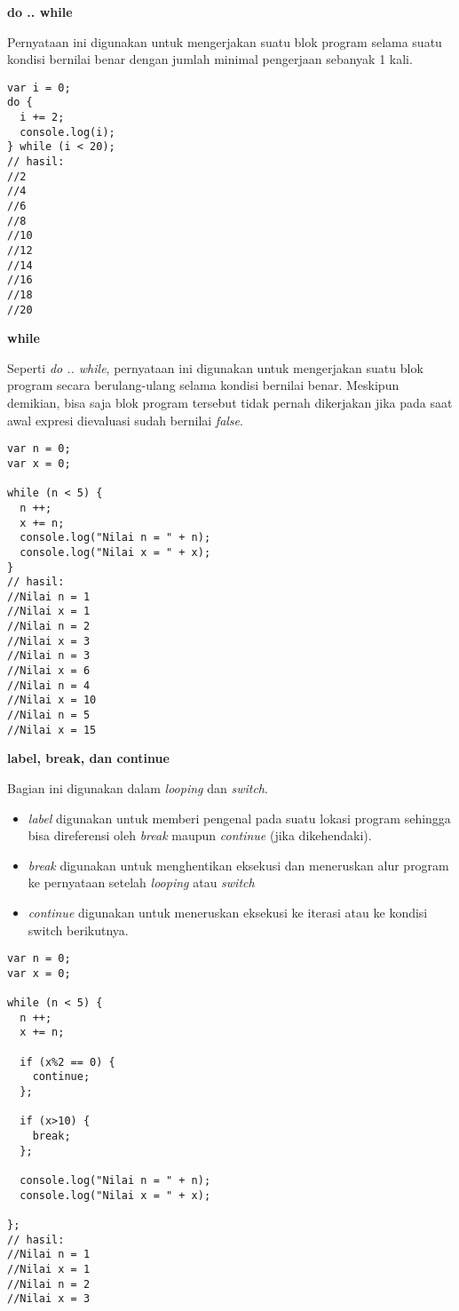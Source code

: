 \textbf{do .. while}

Pernyataan ini digunakan untuk mengerjakan suatu blok program selama suatu kondisi bernilai benar dengan jumlah minimal pengerjaan sebanyak 1 kali.

\begin{lstlisting}
var i = 0;
do {
  i += 2;
  console.log(i);
} while (i < 20);
// hasil:
//2
//4
//6
//8
//10
//12
//14
//16
//18
//20
\end{lstlisting}

\textbf{while}

Seperti \textit{do .. while}, pernyataan ini digunakan untuk mengerjakan suatu blok program secara berulang-ulang selama kondisi bernilai benar. Meskipun demikian, bisa saja blok program tersebut tidak pernah dikerjakan jika pada saat awal expresi dievaluasi sudah bernilai \textit{false}.

\begin{lstlisting}
var n = 0;
var x = 0;

while (n < 5) {
  n ++;
  x += n;
  console.log("Nilai n = " + n);
  console.log("Nilai x = " + x);
}
// hasil:
//Nilai n = 1
//Nilai x = 1
//Nilai n = 2
//Nilai x = 3
//Nilai n = 3
//Nilai x = 6
//Nilai n = 4
//Nilai x = 10
//Nilai n = 5
//Nilai x = 15
\end{lstlisting}

\textbf{label, break, dan continue}

Bagian ini digunakan dalam \textit{looping} dan \textit{switch}.
\begin{itemize}
  \item \textit{label} digunakan untuk memberi pengenal pada suatu lokasi program sehingga bisa direferensi oleh \textit{break} maupun \textit{continue} (jika dikehendaki). 
  \item \textit{break} digunakan untuk menghentikan eksekusi dan meneruskan alur program ke pernyataan setelah \textit{looping} atau \textit{switch}
  \item \textit{continue} digunakan untuk meneruskan eksekusi ke iterasi atau ke kondisi switch berikutnya.
\end{itemize}

\begin{lstlisting}
var n = 0;
var x = 0;

while (n < 5) {
  n ++;
  x += n;

  if (x%2 == 0) {
    continue;
  };

  if (x>10) {
    break;
  };

  console.log("Nilai n = " + n);
  console.log("Nilai x = " + x);

};
// hasil:
//Nilai n = 1
//Nilai x = 1
//Nilai n = 2
//Nilai x = 3
\end{lstlisting}

